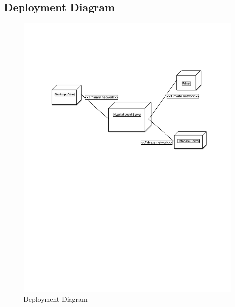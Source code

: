 \documentclass[14pt]{article}
\begin{document}
\subsection{Deployment Diagram}
\begin{figure}[h!]
\centering 
  \caption{Deployment Diagram}
  \includegraphics[width=15cm,keepaspectratio]{DeploymentDiagram.pdf}
\end{figure}
\newpage 
\end{document}
